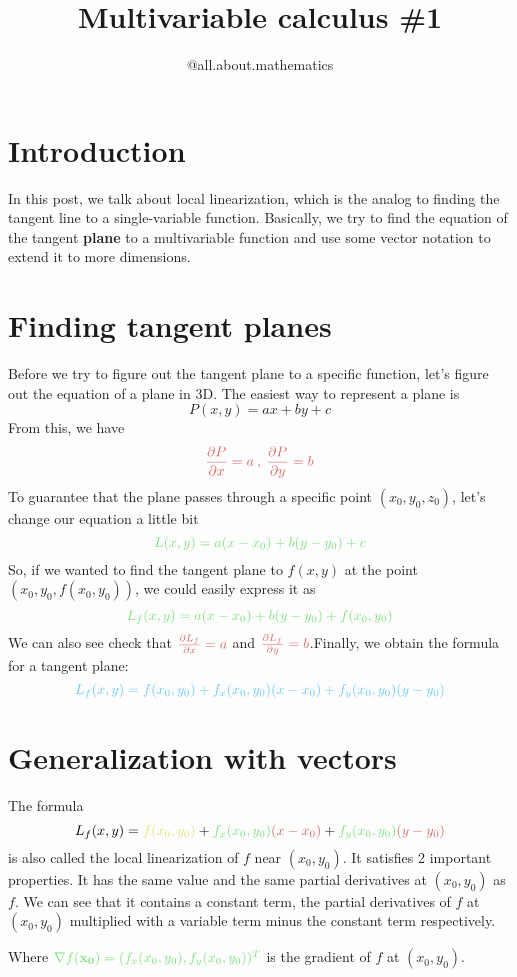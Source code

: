\documentclass[10pt]{article}
\title{\Huge{Multivariable calculus \#1}}
\author{@all.about.mathematics}
\begin{document}
\maketitle
\pagecolor{black}
\Large{\section{Introduction}
In this post, we talk about local linearization, which is the analog to finding the tangent line to a single-variable function. Basically, we try to find the equation of the tangent \textbf{plane} to a multivariable function and use some vector notation to extend it to more dimensions.}
\newpage
\section{Finding tangent planes}
\Large{Before we try to figure out the tangent plane to a specific function, let's figure out the equation of a plane in 3D. The easiest way to represent a plane is $$P(x,y)=ax+by+c$$From this, we have $$\color{myred}\frac{\partial P}{\partial x}=a\:,\: \frac{\partial P}{\partial y}=b$$To guarantee that the plane passes through a specific point $(x_0,y_0,z_0)$, let's change our equation a little bit $$\color{mygreen}L(x,y)=a(x-x_0)+b(y-y_0)+c$$So, if we wanted to find the tangent plane to $f(x,y)$ at the point $(x_0,y_0,f(x_0,y_0))$, we could easily express it as $$\color{mygreen}L_f(x,y)=a(x-x_0)+b(y-y_0)+f(x_0,y_0)$$We can also see check that $\color{myred}\frac{\partial L_f}{\partial x}=a$ and $\color{myred} \frac{\partial L_f}{\partial y}=b$.Finally, we obtain the formula for a tangent plane:$$\color{myblue}L_f(x,y)=f(x_0,y_0)+f_x(x_0,y_0)(x-x_0)+f_y(x_0,y_0)(y-y_0)$$ }

\newpage
\section{Generalization with vectors}
\Large{The formula $$L_f(x,y)=\textcolor{myyellow}{f(x_0,y_0)}+\textcolor {mygreen}{f_x(x_0,y_0)}\textcolor{myred}{(x-x_0)}+\textcolor {mygreen}{f_y(x_0,y_0)}\textcolor{myred}{(y-y_0)}$$is also called the local linearization of $f$ near $(x_0,y_0)$. It satisfies 2 important properties. It has the same value and the same partial derivatives at $(x_0,y_0)$ as $f$. We can see that it contains a \textcolor{myyellow}{constant term}, the \textcolor{mygreen}{partial derivatives of $f$ at $(x_0,y_0)$} multiplied with a \textcolor{myred}{variable term minus the constant term respectively.}

Where $\textcolor{mygreen}{\nabla f(\bold{x_0})=(f_x(x_0,y_0),f_y(x_0,y_0))^T}$ is the gradient of $f$ at $(x_0,y_0)$. }
\newpage
\end{document}
